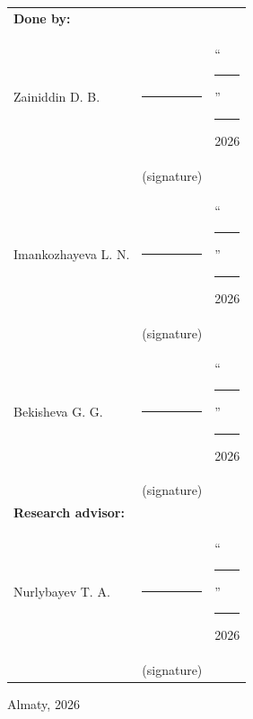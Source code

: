 \vspace{1.5cm}

\noindent
\begin{tabular}{@{}p{7cm}p{4cm}p{3.5cm}@{}}
\textbf{Done by:} & & \\[0.3cm]
Zainiddin D. B.       & \rule{4cm}{0.4pt} & ``\rule{1cm}{0.4pt}'' \rule{2cm}{0.4pt} 2026 \\
                      & \multicolumn{1}{c}{\footnotesize (signature)} & \\[0.2cm]
Imankozhayeva L. N.   & \rule{4cm}{0.4pt} & ``\rule{1cm}{0.4pt}'' \rule{2cm}{0.4pt} 2026 \\
                      & \multicolumn{1}{c}{\footnotesize (signature)} & \\[0.2cm]
Bekisheva G. G.       & \rule{4cm}{0.4pt} & ``\rule{1cm}{0.4pt}'' \rule{2cm}{0.4pt} 2026 \\
                      & \multicolumn{1}{c}{\footnotesize (signature)} & \\[0.5cm]
\textbf{Research advisor:} & & \\[0.3cm]
Nurlybayev T. A.      & \rule{4cm}{0.4pt} & ``\rule{1cm}{0.4pt}'' \rule{2cm}{0.4pt} 2026 \\
                      & \multicolumn{1}{c}{\footnotesize (signature)} & \\
\end{tabular}

\vfill

\begin{center}
{\fontsize{14pt}{18pt}\selectfont Almaty, 2026\par}
\end{center}

\newpage
